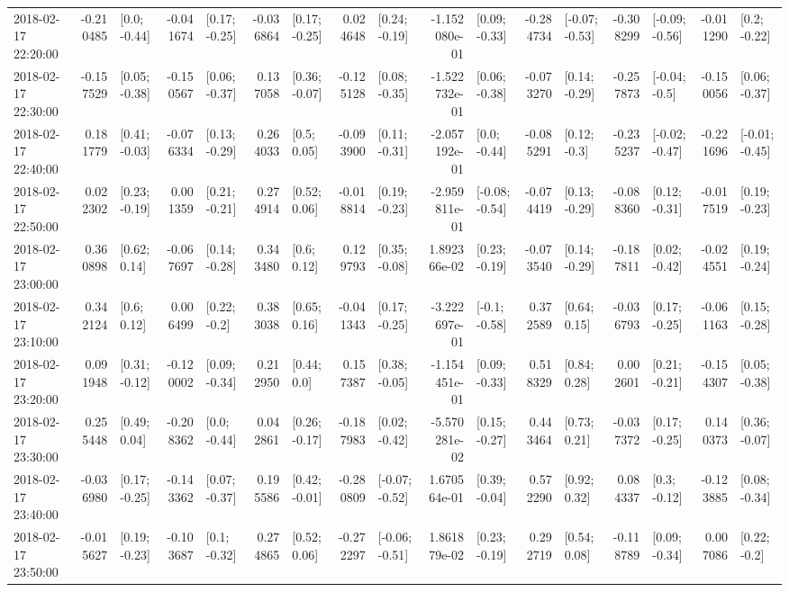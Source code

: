 \begin{tabular}{lrlrlrlrlrlrlrlrl}
2018-02-17 22:20:00 & -0.210485 &    [0.0; -0.44] & -0.041674 &   [0.17; -0.25] & -0.036864 &   [0.17; -0.25] &  0.024648 &   [0.24; -0.19] & -1.152080e-01 &   [0.09; -0.33] & -0.284734 &  [-0.07; -0.53] & -0.308299 &  [-0.09; -0.56] & -0.011290 &    [0.2; -0.22] \\
2018-02-17 22:30:00 & -0.157529 &   [0.05; -0.38] & -0.150567 &   [0.06; -0.37] &  0.137058 &   [0.36; -0.07] & -0.125128 &   [0.08; -0.35] & -1.522732e-01 &   [0.06; -0.38] & -0.073270 &   [0.14; -0.29] & -0.257873 &   [-0.04; -0.5] & -0.150056 &   [0.06; -0.37] \\
2018-02-17 22:40:00 &  0.181779 &   [0.41; -0.03] & -0.076334 &   [0.13; -0.29] &  0.264033 &     [0.5; 0.05] & -0.093900 &   [0.11; -0.31] & -2.057192e-01 &    [0.0; -0.44] & -0.085291 &    [0.12; -0.3] & -0.235237 &  [-0.02; -0.47] & -0.221696 &  [-0.01; -0.45] \\
2018-02-17 22:50:00 &  0.022302 &   [0.23; -0.19] &  0.001359 &   [0.21; -0.21] &  0.274914 &    [0.52; 0.06] & -0.018814 &   [0.19; -0.23] & -2.959811e-01 &  [-0.08; -0.54] & -0.074419 &   [0.13; -0.29] & -0.088360 &   [0.12; -0.31] & -0.017519 &   [0.19; -0.23] \\
2018-02-17 23:00:00 &  0.360898 &    [0.62; 0.14] & -0.067697 &   [0.14; -0.28] &  0.343480 &     [0.6; 0.12] &  0.129793 &   [0.35; -0.08] &  1.892366e-02 &   [0.23; -0.19] & -0.073540 &   [0.14; -0.29] & -0.187811 &   [0.02; -0.42] & -0.024551 &   [0.19; -0.24] \\
2018-02-17 23:10:00 &  0.342124 &     [0.6; 0.12] &  0.006499 &    [0.22; -0.2] &  0.383038 &    [0.65; 0.16] & -0.041343 &   [0.17; -0.25] & -3.222697e-01 &   [-0.1; -0.58] &  0.372589 &    [0.64; 0.15] & -0.036793 &   [0.17; -0.25] & -0.061163 &   [0.15; -0.28] \\
2018-02-17 23:20:00 &  0.091948 &   [0.31; -0.12] & -0.120002 &   [0.09; -0.34] &  0.212950 &     [0.44; 0.0] &  0.157387 &   [0.38; -0.05] & -1.154451e-01 &   [0.09; -0.33] &  0.518329 &    [0.84; 0.28] &  0.002601 &   [0.21; -0.21] & -0.154307 &   [0.05; -0.38] \\
2018-02-17 23:30:00 &  0.255448 &    [0.49; 0.04] & -0.208362 &    [0.0; -0.44] &  0.042861 &   [0.26; -0.17] & -0.187983 &   [0.02; -0.42] & -5.570281e-02 &   [0.15; -0.27] &  0.443464 &    [0.73; 0.21] & -0.037372 &   [0.17; -0.25] &  0.140373 &   [0.36; -0.07] \\
2018-02-17 23:40:00 & -0.036980 &   [0.17; -0.25] & -0.143362 &   [0.07; -0.37] &  0.195586 &   [0.42; -0.01] & -0.280809 &  [-0.07; -0.52] &  1.670564e-01 &   [0.39; -0.04] &  0.572290 &    [0.92; 0.32] &  0.084337 &    [0.3; -0.12] & -0.123885 &   [0.08; -0.34] \\
2018-02-17 23:50:00 & -0.015627 &   [0.19; -0.23] & -0.103687 &    [0.1; -0.32] &  0.274865 &    [0.52; 0.06] & -0.272297 &  [-0.06; -0.51] &  1.861879e-02 &   [0.23; -0.19] &  0.292719 &    [0.54; 0.08] & -0.118789 &   [0.09; -0.34] &  0.007086 &    [0.22; -0.2] \\
\bottomrule
\end{tabular}
